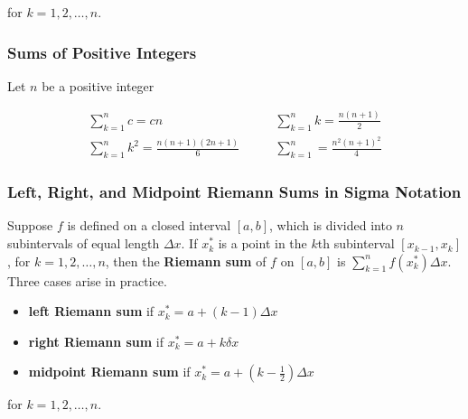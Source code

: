 for $k = 1, 2, \ldots, n$.


\subsubsection{Sums of Positive Integers}
Let $n$ be a positive integer

\begin{align}
    \sum_{k = 1} ^n c = cn \qquad& \sum _{k = 1} ^n k = \frac{n(n + 1)}{2} \\
    \sum_{k = 1} ^n k^2 = \frac{n(n + 1)(2n + 1)}{6} \qquad& \sum_{k = 1} ^n = \frac{n^2{(n + 1)}^2}{4}
\end{align}

\subsubsection{Left, Right, and Midpoint Riemann Sums in Sigma Notation}
Suppose $f$ is defined on a closed interval $[a, b]$, which is divided into $n$ subintervals of equal length $\Delta x$. If $x_k ^*$ is a point in the $k$th subinterval $[x_{k - 1}, x_k]$, for $k = 1, 2, \ldots, n$, then the \textbf{Riemann sum} of $f$ on $[a, b]$ is $\sum _{k = 1} ^n f(x_k ^*) \Delta x$. Three cases arise in practice.

\begin{itemize}
    \item \textbf{left Riemann sum} if $x_k ^* = a + (k - 1) \Delta x$
    \item \textbf{right Riemann sum} if $x_k ^* = a + k \delta x$
    \item \textbf{midpoint Riemann sum} if $x_k ^* = a + (k - \frac{1}{2})\Delta x$
\end{itemize}

for $k = 1, 2, \ldots, n$.
